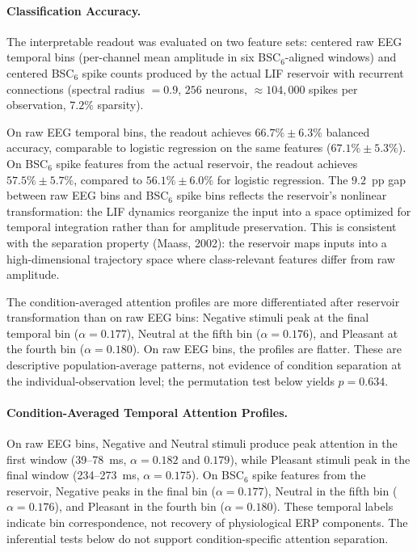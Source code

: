 \paragraph{Classification Accuracy.} The interpretable readout was evaluated on two feature sets: centered raw EEG temporal bins (per-channel mean amplitude in six BSC$_6$-aligned windows) and centered BSC$_6$ spike counts produced by the actual LIF reservoir with recurrent connections (spectral radius $= 0.9$, $256$ neurons, $\approx 104{,}000$ spikes per observation, $7.2\%$ sparsity).

On raw EEG temporal bins, the readout achieves $66.7\% \pm 6.3\%$ balanced accuracy, comparable to logistic regression on the same features ($67.1\% \pm 5.3\%$). On BSC$_6$ spike features from the actual reservoir, the readout achieves $57.5\% \pm 5.7\%$, compared to $56.1\% \pm 6.0\%$ for logistic regression. The $9.2$~pp gap between raw EEG bins and BSC$_6$ spike bins reflects the reservoir's nonlinear transformation: the LIF dynamics reorganize the input into a space optimized for temporal integration rather than for amplitude preservation. This is consistent with the separation property (Maass, 2002): the reservoir maps inputs into a high-dimensional trajectory space where class-relevant features differ from raw amplitude.

The condition-averaged attention profiles are more differentiated after reservoir transformation than on raw EEG bins: Negative stimuli peak at the final temporal bin ($\alpha = 0.177$), Neutral at the fifth bin ($\alpha = 0.176$), and Pleasant at the fourth bin ($\alpha = 0.180$). On raw EEG bins, the profiles are flatter. These are descriptive population-average patterns, not evidence of condition separation at the individual-observation level; the permutation test below yields $p = 0.634$.

\paragraph{Condition-Averaged Temporal Attention Profiles.} On raw EEG bins, Negative and Neutral stimuli produce peak attention in the first window (39--78~ms, $\alpha = 0.182$ and $0.179$), while Pleasant stimuli peak in the final window (234--273~ms, $\alpha = 0.175$). On BSC$_6$ spike features from the reservoir, Negative peaks in the final bin ($\alpha = 0.177$), Neutral in the fifth bin ($\alpha = 0.176$), and Pleasant in the fourth bin ($\alpha = 0.180$). These temporal labels indicate bin correspondence, not recovery of physiological ERP components. The inferential tests below do not support condition-specific attention separation.

